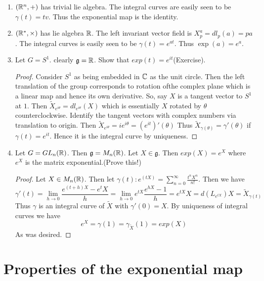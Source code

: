 \documentclass{article}
\begin{document}
\begin{example*}
    \begin{enumerate}
        \item $(\mathbb R^n,+)$ has trivial lie algebra. The integral curves are easily seen to be $\gamma(t) = tv$. Thus the exponential map is the identity.
        \item $(\mathbb R^*,\times)$ has lie algebra $\mathbb R$. The left invariant vector field is $X^a_p = dl_p(a) = pa$. The integral curves is easily seen to be $\gamma(t) = e^{at}$. Thus $\exp(a) = e^a$.
        \item Let $G=S^1$. clearly $\mathfrak{g} = \mathbb R$. Show that $exp(t) = e^{it}$(Exercise).
        \begin{proof}
            Consider $S^1$ as being embedded in $\mathbb C$ as the unit circle. Then the left translation of the group corresponds to rotation ofthe complex plane which is a linear map and hence its own derivative. So, say $X$ is a tangent vector to $S^1$ at $1$. Then $\tilde{X}_{e^{i\theta}} = dl_{e^{i\theta}}(X)$ which is essentially $X$ rotated by $\theta$ counterclockwise. Identify the tangent vectors with complex numbers via translation to origin. Then $\tilde{X}_{e^{i\theta}} = ie^{i\theta} = (e^{it})'(\theta)$
            Thus $\tilde{X}_{\gamma(\theta)} = \gamma'(\theta)$ if $\gamma(t) = e^{it}$. Hence it is the integral curve by uniqueness. 
        \end{proof}
        \item Let $G=GL_n(\mathbb R)$. Then $\mathfrak{g} = M_n(\mathbb R)$. Let $X\in \mathfrak{g}$. Then $exp(X) = e^X$ where $e^X$ is the matrix exponential.(Prove this!)
        \begin{proof}
            Let $X\in M_n(\mathbb R)$. Then let $\gamma(t): e^(tX) = \sum_{n=0}^{\infty} \frac{t^nX^n}{n!}$. Then we have $$\gamma'(t) = \lim_{h\to 0}\frac{e^{(t+h)X}-e^tX}{h} = \lim_{h\to 0}e^{tX}\frac{e^{hX}-1}{h} = e^{tX}X = d(L_{e^{tX}})X = \tilde{X}_{\gamma(t)}$$
            Thus $\gamma$ is an integral curve of $\tilde{X}$ with $\gamma'(0)=X$. By uniqueness of integral curves we have $$e^X = \gamma(1) = \gamma_{\tilde{X}}(1) = exp(X)$$
            As was desired.
        \end{proof}
    \end{enumerate}
    
\end{example*}

\section{Properties of the exponential map}
\end{document}
